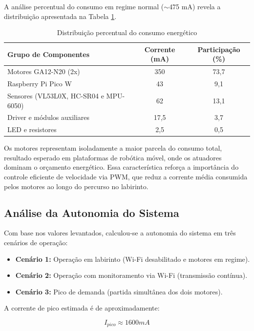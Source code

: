 A análise percentual do consumo em regime normal ($\sim$475 mA) revela a distribuição apresentada na Tabela \ref{tab:distribuicao_consumo}.

\begin{table}[H]
\centering
\caption{Distribuição percentual do consumo energético}
\label{tab:distribuicao_consumo}
\begin{tabular}{|l|c|c|}
\hline
\textbf{Grupo de Componentes} & \textbf{Corrente (mA)} & \textbf{Participação (\%)} \\
\hline
Motores GA12-N20 (2x) & 350 & 73,7 \\
\hline
Raspberry Pi Pico W & 43 & 9,1 \\
\hline
Sensores (VL53L0X, HC-SR04 e MPU-6050) & 62 & 13,1 \\
\hline
Driver e módulos auxiliares & 17,5 & 3,7 \\
\hline
LED e resistores & 2,5 & 0,5 \\
\hline
\end{tabular}
\end{table}

Os motores representam isoladamente a maior parcela do consumo total, resultado esperado em plataformas de robótica móvel, onde os atuadores dominam o orçamento energético. Essa característica reforça a importância do controle eficiente de velocidade via PWM, que reduz a corrente média consumida pelos motores ao longo do percurso no labirinto.

\subsection{Análise da Autonomia do Sistema}

Com base nos valores levantados, calculou-se a autonomia do sistema em três cenários de operação:

\begin{itemize}
    \item \textbf{Cenário 1:} Operação em labirinto (Wi-Fi desabilitado e motores em regime).
    \item \textbf{Cenário 2:} Operação com monitoramento via Wi-Fi (transmissão contínua).
    \item \textbf{Cenário 3:} Pico de demanda (partida simultânea dos dois motores).
\end{itemize}

A corrente de pico estimada é de aproximadamente:

\begin{equation}
I_{pico} \approx 1600 { mA}
\end{equation}


